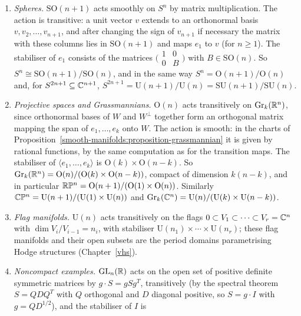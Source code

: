 \begin{example}\label{lie-groups:example-homogeneous}
\begin{enumerate}
\item \emph{Spheres.} $\mathrm{SO}(n + 1)$ acts smoothly on $S^n$ by matrix multiplication. The action is transitive: a unit vector $v$ extends to an
orthonormal basis $v, v_2, \ldots, v_{n+1}$, and after changing the sign of $v_{n+1}$ if necessary the matrix with these columns lies in $\mathrm{SO}(n + 1)$ and
maps $e_1$ to $v$ (for $n \geq 1$). The stabiliser of $e_1$ consists of the matrices $\bigl(\begin{smallmatrix}1 & 0\\ 0 & B\end{smallmatrix}\bigr)$ with
$B \in \mathrm{SO}(n)$. So $S^n \cong \mathrm{SO}(n + 1)/\mathrm{SO}(n)$, and in the same way $S^n = \mathrm{O}(n + 1)/\mathrm{O}(n)$ and, for
$S^{2n+1} \subseteq \mathbb{C}^{n+1}$, $S^{2n+1} = \mathrm{U}(n + 1)/\mathrm{U}(n) = \mathrm{SU}(n + 1)/\mathrm{SU}(n)$.
\item \emph{Projective spaces and Grassmannians.} $\mathrm{O}(n)$ acts transitively on $\mathrm{Gr}_k(\mathbb{R}^n)$, since orthonormal bases of $W$ and $W^\perp$
together form an orthogonal matrix mapping the span of $e_1, \ldots, e_k$ onto $W$. The action is smooth: in the charts of
Proposition~\ref{smooth-manifolds:proposition-grassmannian} it is given by rational functions, by the same computation as for the transition maps. The
stabiliser of $\langle e_1, \ldots, e_k\rangle$ is $\mathrm{O}(k) \times \mathrm{O}(n - k)$. So
$\mathrm{Gr}_k(\mathbb{R}^n) = \mathrm{O}(n)/(\mathrm{O}(k) \times \mathrm{O}(n - k))$, compact of dimension $k(n - k)$, and in particular
$\mathbb{R}\mathbb{P}^n = \mathrm{O}(n + 1)/(\mathrm{O}(1) \times \mathrm{O}(n))$. Similarly
$\mathbb{C}\mathbb{P}^n = \mathrm{U}(n + 1)/(\mathrm{U}(1) \times \mathrm{U}(n))$ and $\mathrm{Gr}_k(\mathbb{C}^n) = \mathrm{U}(n)/(\mathrm{U}(k) \times \mathrm{U}(n - k))$.
\item \emph{Flag manifolds.} $\mathrm{U}(n)$ acts transitively on the flags $0 \subset V_1 \subset \cdots \subset V_r = \mathbb{C}^n$ with $\dim V_i/V_{i-1} = n_i$,
with stabiliser $\mathrm{U}(n_1) \times \cdots \times \mathrm{U}(n_r)$; these flag manifolds and their open subsets are the period domains parametrising Hodge
structures (Chapter~\ref{vhs}).
\item \emph{Noncompact examples.} $\mathrm{GL}_n(\mathbb{R})$ acts on the open set of positive definite symmetric matrices by $g \cdot S = gSg^T$, transitively (by the
spectral theorem $S = QDQ^T$ with $Q$ orthogonal and $D$ diagonal positive, so $S = g \cdot I$ with $g = QD^{1/2}$), and the stabiliser of $I$ is

\end{enumerate}
\end{example}
